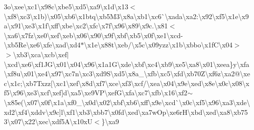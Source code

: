 3o\textbackslash{}xee\textbackslash{}xc1\textbackslash{}x98c\textbackslash{}xbe5\textbackslash{}xd5\textbackslash{}xa9\textbackslash{}x1d\textbackslash{}x13$<$\textbackslash{}xf8\textbackslash{}xc3\textbackslash{}x1b)\textbackslash{}x05\textbackslash{}xb6\textbackslash{}x1btq\textbackslash{}xb5\+M3\textbackslash{}x8a\textbackslash{}xb1\textbackslash{}xc6\`{}\textbackslash{}xada\textbackslash{}xa2\+:\textbackslash{}x92\textbackslash{}xf5\textbackslash{}x1e\textbackslash{}x9a\textbackslash{}x91\textbackslash{}xe3\textbackslash{}x1f\textbackslash{}xff\textbackslash{}xbe\textbackslash{}xc2\textbackslash{}xfc\textbackslash{}x7f\textbackslash{}x96\textbackslash{}x89\textbackslash{}x9c.\textbackslash{}x81$<$\textbackslash{}xa6\textbackslash{}x7fz\textbackslash{}xe0\textbackslash{}xef\textbackslash{}xeb\textbackslash{}x06\textbackslash{}x90\textbackslash{}x9f\textbackslash{}xbf\textbackslash{}xb5\textbackslash{}x0f\textbackslash{}xe1\textbackslash{}xcd-\/\textbackslash{}xb5\+Re\textbackslash{}xe6\textbackslash{}xfe\textbackslash{}xad\textbackslash{}xd4$\ast$\textbackslash{}x1e\textbackslash{}x88t\textbackslash{}xeb/\textbackslash{}x5c\textbackslash{}x09yzz\textbackslash{}x1b\textbackslash{}xbbo\textbackslash{}x1f\+C\textbackslash{}x04$>$$>$\textbackslash{}xb3\textbackslash{}xca\textbackslash{}xcb\textbackslash{}xef$\vert$\textbackslash{}xcd\textbackslash{}xe6\textbackslash{}xf1\+J\+G\textbackslash{}x01\textbackslash{}x04\textbackslash{}x96\textbackslash{}x1a1\+G\textbackslash{}xde\textbackslash{}xbf\textbackslash{}xc4\textbackslash{}xb9\textbackslash{}xe5\textbackslash{}xa8\textbackslash{}x01\textbackslash{}xeea\}y\textbackslash{}xfa\textbackslash{}xf8u\textbackslash{}x01\textbackslash{}xe4\textbackslash{}x97\textbackslash{}xc7n\textbackslash{}xc3\textbackslash{}xd9\+S\textbackslash{}xd5\textbackslash{}x8a\+\_\+\textbackslash{}xfb\textbackslash{}xc5\textbackslash{}xfd\textbackslash{}xb70\+Z\textbackslash{}xf6z\textbackslash{}xa2@\textbackslash{}xec\textbackslash{}x1c;\textbackslash{}xb7\+Txzz\mbox{[}\textbackslash{}xc1\textbackslash{}xef\textbackslash{}x8d\textbackslash{}xf7\textbackslash{}xce\textbackslash{}xf3\textbackslash{}xcf/\textbackslash{}xea\textbackslash{}x04\textbackslash{}x9e\textbackslash{}xed\textbackslash{}x8e\textbackslash{}x0c\textbackslash{}x08\textbackslash{}xf5\textbackslash{}x96\textbackslash{}xe3\textbackslash{}xcf\textbackslash{}xef\mbox{]}d\textbackslash{}xa5\textbackslash{}xe9\+V\+P\textbackslash{}xef\+G\textbackslash{}xfa\textbackslash{}xc7\textbackslash{}xfb\textbackslash{}x16\textbackslash{}xf2$\sim$\textbackslash{}x85e(\textbackslash{}x07\textbackslash{}x0f\textbackslash{}x1a\textbackslash{}xf0\+\_\+\textbackslash{}x0d\textbackslash{}x02\textbackslash{}xbf\textbackslash{}xb6\textbackslash{}xff\textbackslash{}x9e\textbackslash{}xcd\`{}\textbackslash{}x0c\textbackslash{}xf5\textbackslash{}x96\textbackslash{}xa3\textbackslash{}xde\textbackslash{}xd2\textbackslash{}xf4\textbackslash{}xddv\textbackslash{}x9c\mbox{]}l\textbackslash{}xf1\textbackslash{}xb3\textbackslash{}xbb7\textbackslash{}x0fd\textbackslash{}xed\textbackslash{}xa7w\+Op\textbackslash{}xe6r\+H\textbackslash{}xbd\textbackslash{}xed\textbackslash{}xa8\textbackslash{}xb753\textbackslash{}x07\textbackslash{}x22\textbackslash{}xec\textbackslash{}xdf5\+A\textbackslash{}x10x\+U$<$\}\textbackslash{}xa9\
